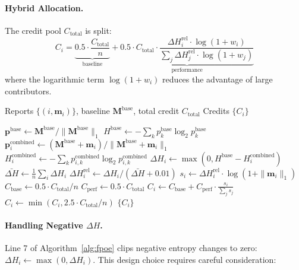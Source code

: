 \documentclass[12pt,a4paper]{article}
\begin{document}
\paragraph{Hybrid Allocation.} The credit pool $C_{\text{total}}$ is split:
\begin{equation}
C_i = \underbrace{0.5 \cdot \frac{C_{\text{total}}}{n}}_{\text{baseline}} + \underbrace{0.5 \cdot C_{\text{total}} \cdot \frac{\Delta H_i^{\text{rel}} \cdot \log(1+w_i)}{\sum_j \Delta H_j^{\text{rel}} \cdot \log(1+w_j)}}_{\text{performance}}
\end{equation}
where the logarithmic term $\log(1+w_i)$ reduces the advantage of large contributors.

\begin{algorithm}[h]
\caption{Federated PoER (F-PoER) Allocation}
\label{alg:fpoe}
\begin{algorithmic}[1]
\Require Reports $\{(i, \mathbf{m}_i)\}$, baseline $\mathbf{M}^{\text{base}}$, total credit $C_{\text{total}}$
\Ensure Credits $\{C_i\}$

\State $\mathbf{p}^{\text{base}} \gets \mathbf{M}^{\text{base}} / \|\mathbf{M}^{\text{base}}\|_1$
\State $H^{\text{base}} \gets -\sum_k p_k^{\text{base}} \log_2 p_k^{\text{base}}$
    \State $\mathbf{p}_i^{\text{combined}} \gets (\mathbf{M}^{\text{base}} + \mathbf{m}_i) / \|\mathbf{M}^{\text{base}} + \mathbf{m}_i\|_1$
    \State $H_i^{\text{combined}} \gets -\sum_k p_{i,k}^{\text{combined}} \log_2 p_{i,k}^{\text{combined}}$
    \State $\Delta H_i \gets \max(0, H^{\text{base}} - H_i^{\text{combined}})$ 
\EndFor
\State $\bar{\Delta H} \gets \frac{1}{n}\sum_i \Delta H_i$
    \State $\Delta H_i^{\text{rel}} \gets \Delta H_i / (\bar{\Delta H} + 0.01)$
    \State $s_i \gets \Delta H_i^{\text{rel}} \cdot \log(1 + \|\mathbf{m}_i\|_1)$
\EndFor
\State $C_{\text{base}} \gets 0.5 \cdot C_{\text{total}} / n$
\State $C_{\text{perf}} \gets 0.5 \cdot C_{\text{total}}$
    \State $C_i \gets C_{\text{base}} + C_{\text{perf}} \cdot \frac{s_i}{\sum_j s_j}$
    \State $C_i \gets \min(C_i, 2.5 \cdot C_{\text{total}}/n)$ 
\EndFor
\State \Return $\{C_i\}$
\end{algorithmic}
\end{algorithm}

\paragraph{Handling Negative $\Delta H$.} Line 7 of Algorithm~\ref{alg:fpoe} clips negative entropy changes to zero: $\Delta H_i \leftarrow \max(0, \Delta H_i)$. This design choice requires careful consideration:
\end{document}
